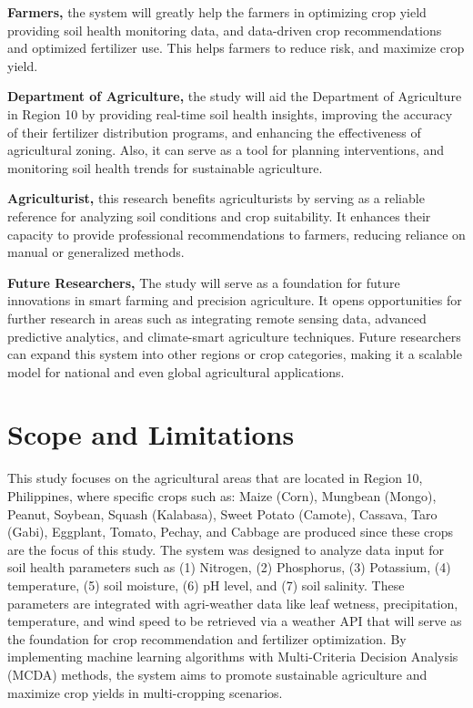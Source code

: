 {\textbf{Farmers,} the system will greatly help the farmers in optimizing crop yield providing soil health monitoring data, and data-driven crop recommendations and optimized fertilizer use. This helps farmers to reduce risk, and maximize crop yield. 

\textbf{Department of Agriculture,} the study will aid the Department of Agriculture in Region 10 by providing real-time soil health insights, improving the accuracy of their fertilizer distribution programs, and enhancing the effectiveness of agricultural zoning. Also, it can serve as a tool for planning interventions, and monitoring soil health trends for sustainable agriculture.

\textbf{Agriculturist,} this research benefits agriculturists by serving as a reliable reference for analyzing soil conditions and crop suitability. It enhances their capacity to provide professional recommendations to farmers, reducing reliance on manual or generalized methods.

\textbf{Future Researchers,} The study will serve as a foundation for future innovations in smart farming and precision agriculture. It opens opportunities for further research in areas such as integrating remote sensing data, advanced predictive analytics, and climate-smart agriculture techniques. Future researchers can expand this system into other regions or crop categories, making it a scalable model for national and even global agricultural applications.

\section{Scope and Limitations}

This study focuses on the agricultural areas that are located in Region 10, Philippines, where specific crops such as: Maize (Corn), Mungbean (Mongo), Peanut, Soybean, Squash (Kalabasa), Sweet Potato (Camote), Cassava, Taro (Gabi), Eggplant, Tomato, Pechay, and Cabbage are produced since these crops are the focus of this study. The system was designed to analyze data input for soil health parameters such as (1) Nitrogen, (2) Phosphorus, (3) Potassium, (4) temperature,  (5) soil moisture, (6) pH level, and (7) soil salinity. These parameters are integrated with agri-weather data like leaf wetness, precipitation, temperature, and wind speed to be retrieved via a weather API that will serve as the foundation for crop recommendation and fertilizer optimization. By implementing machine learning algorithms with Multi-Criteria Decision Analysis (MCDA) methods, the system aims to promote sustainable agriculture and maximize crop yields in multi-cropping scenarios.

}
